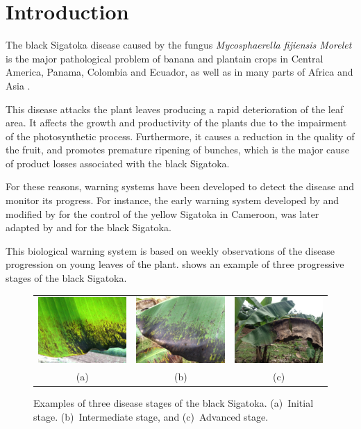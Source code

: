 \section{Introduction}

The black Sigatoka disease caused by the fungus \emph{Mycosphaerella
  fijiensis Morelet} is the major pathological problem of banana and
plantain crops in Central America, Panama, Colombia and Ecuador, as well as in
many parts of Africa and Asia \citep{MarinVargas1995}.

This disease attacks the plant leaves producing a rapid deterioration
of the leaf area. It affects the growth and productivity of the plants
due to the impairment of the photosynthetic process.  Furthermore, it
causes a reduction in the quality of the fruit, and promotes premature
ripening of bunches, which is the major cause of product losses
associated with the black Sigatoka.

For these reasons, warning systems have been developed to detect the
disease and monitor its progress.  For instance, the early warning
system developed by \citet{ganry1983} and modified by
\citet{ganry1972} for the control of the yellow Sigatoka in Cameroon,
was later adapted by \citet{Ternesien1985} and \citet{foure1988} for
the black Sigatoka.

This biological warning system is based on weekly observations of the
disease progression on young leaves of the plant.
%
 shows an example of three progressive
stages of the black Sigatoka.
	 
\begin{figure}[ht] 
\centering
\begin{tabular}{c@{\;}c@{\;}c}
  \includegraphics[width=.32\linewidth]{Roya_a} &
  \includegraphics[width=.32\linewidth]{Roya_b} &
  \includegraphics[width=.32\linewidth]{Roya_c} \\
  (a) & (b) & (c) 
\end{tabular}
\caption{Examples of three disease stages of the black Sigatoka. 
(a)~Initial stage. (b)~Intermediate stage, and (c)~Advanced stage.} 
\label{fig:diseasestages} 
\end{figure}

